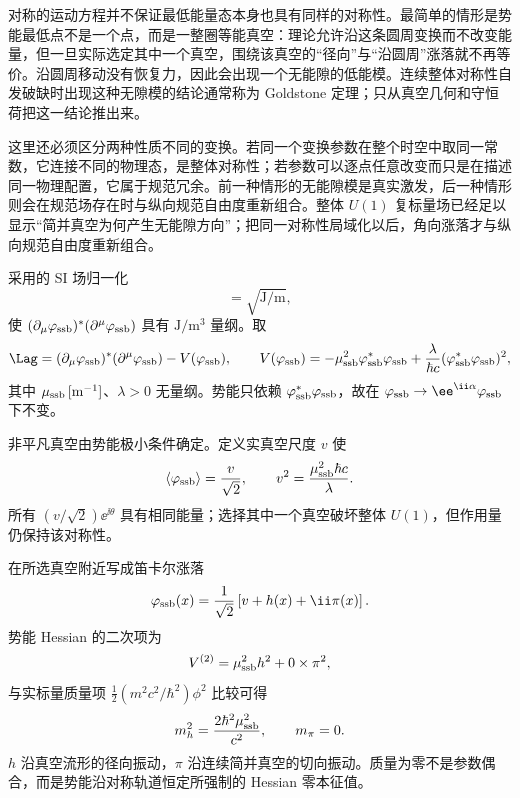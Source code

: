 对称的运动方程并不保证最低能量态本身也具有同样的对称性。最简单的情形是势能最低点不是一个点，而是一整圈等能真空：理论允许沿这条圆周变换而不改变能量，但一旦实际选定其中一个真空，围绕该真空的“径向”与“沿圆周”涨落就不再等价。沿圆周移动没有恢复力，因此会出现一个无能隙的低能模。连续整体对称性自发破缺时出现这种无隙模的结论通常称为 Goldstone 定理；只从真空几何和守恒荷把这一结论推出来。

这里还必须区分两种性质不同的变换。若同一个变换参数在整个时空中取同一常数，它连接不同的物理态，是整体对称性；若参数可以逐点任意改变而只是在描述同一物理配置，它属于规范冗余。前一种情形的无能隙模是真实激发，后一种情形则会在规范场存在时与纵向规范自由度重新组合。整体 \(U(1)\) 复标量场已经足以显示“简并真空为何产生无能隙方向”；把同一对称性局域化以后，角向涨落才与纵向规范自由度重新组合。

采用的 SI 场归一化
\begin{equation*}
 [\varphi_{\rm ssb}]=\sqrt{\mathrm{J/m}},
\end{equation*}
使 \((\partial_\mu\varphi_{\rm ssb})^*(\partial^\mu\varphi_{\rm ssb})\) 具有 \(\mathrm{J/m^3}\) 量纲。取
\begin{equation}
 \Lag
 =(\partial_\mu\varphi_{\rm ssb})^*(\partial^\mu\varphi_{\rm ssb})-V(\varphi_{\rm ssb}),
 \qquad
 V(\varphi_{\rm ssb})
 =-\mu_{\rm ssb}^2\varphi_{\rm ssb}^*\varphi_{\rm ssb}
 +\frac{\lambda}{\hbar c}(\varphi_{\rm ssb}^*\varphi_{\rm ssb})^2,
 \label{eq:ssb-complex-scalar-lag-dp11}
\end{equation}
其中 \(\mu_{\rm ssb}\,[\mathrm{m^{-1}}]\)、\(\lambda>0\) 无量纲。势能只依赖 \(\varphi_{\rm ssb}^*\varphi_{\rm ssb}\)，故在 \(\varphi_{\rm ssb}\to \ee^{\ii\alpha}\varphi_{\rm ssb}\) 下不变。

非平凡真空由势能极小条件确定。定义实真空尺度 \(v\) 使
\begin{equation}
 {
 \langle\varphi_{\rm ssb}\rangle=\frac{v}{\sqrt2},
 \qquad
 v^2=\frac{\mu_{\rm ssb}^2\hbar c}{\lambda}.}
 \label{eq:ssb-vev-general-dp11}
\end{equation}
所有 \((v/\sqrt2)\ee^{\ii\theta}\) 具有相同能量；选择其中一个真空破坏整体 \(U(1)\)，但作用量仍保持该对称性。

在所选真空附近写成笛卡尔涨落
\begin{equation}
 \varphi_{\rm ssb}(x)=\frac1{\sqrt2}\left[v+h(x)+\ii\pi(x)\right].
 \label{eq:ssb-cartesian-fields-dp11}
\end{equation}
势能 Hessian 的二次项为
\begin{equation}
 V^{(2)}=\mu_{\rm ssb}^2h^2+0\times\pi^2,
 \label{eq:ssb-quadratic-potential-dp11}
\end{equation}
与实标量质量项 \(\tfrac12(m^2c^2/\hbar^2)\phi^2\) 比较可得
\begin{equation}
 {
 m_h^2=\frac{2\hbar^2\mu_{\rm ssb}^2}{c^2},
 \qquad
 m_\pi=0.}
 \label{eq:ssb-higgs-goldstone-masses-dp11}
\end{equation}
\(h\) 沿真空流形的径向振动，\(\pi\) 沿连续简并真空的切向振动。质量为零不是参数偶合，而是势能沿对称轨道恒定所强制的 Hessian 零本征值。

